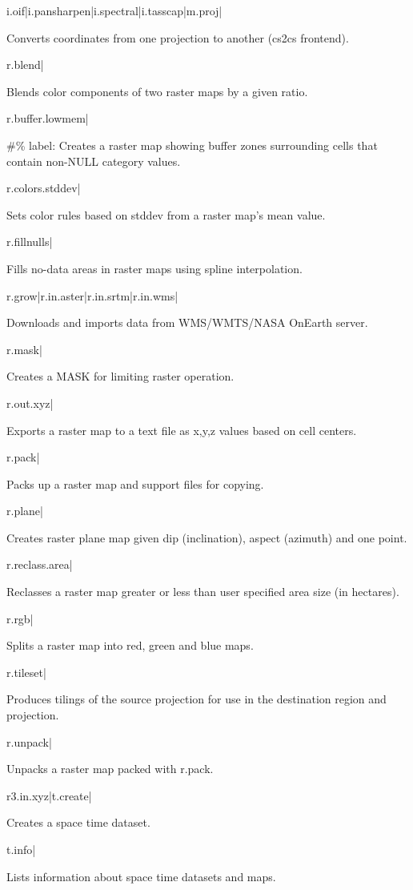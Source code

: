 i.oif|i.pansharpen|i.spectral|i.tasscap|m.proj|

Converts coordinates from one projection to another (cs2cs frontend).

r.blend|

Blends color components of two raster maps by a given ratio.

r.buffer.lowmem|

\#\% label: Creates a raster map showing buffer zones surrounding
cells that contain non-NULL category values.

r.colors.stddev|

Sets color rules based on stddev from a raster map's mean value.

r.fillnulls|

Fills no-data areas in raster maps using spline interpolation.

r.grow|r.in.aster|r.in.srtm|r.in.wms|

Downloads and imports data from WMS/WMTS/NASA OnEarth server.

r.mask|

Creates a MASK for limiting raster operation.

r.out.xyz|

Exports a raster map to a text file as x,y,z values based on cell
centers.

r.pack|

Packs up a raster map and support files for copying.

r.plane|

Creates raster plane map given dip (inclination), aspect (azimuth)
and one point.

r.reclass.area|

Reclasses a raster map greater or less than user specified area size
(in hectares).

r.rgb|

Splits a raster map into red, green and blue maps.

r.tileset|

Produces tilings of the source projection for use in the destination
region and projection.

r.unpack|

Unpacks a raster map packed with r.pack.

r3.in.xyz|t.create|

Creates a space time dataset.

t.info|

Lists information about space time datasets and maps.

